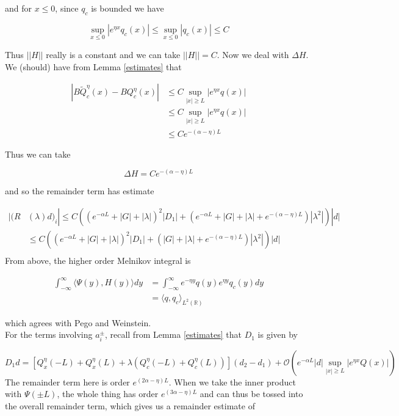 \documentclass[12pt]{article}
\def\R{{\mathbb R}}
\begin{document}
and for $x \leq 0$, since $q_c$ is bounded we have

\[
\sup_{x \leq 0} |e^{\eta x} q_c(x)| \leq \sup_{x \leq 0} |q_c(x)| \leq C
\]

Thus $||H||$ really is a constant and we can take $||H|| = C$. Now we deal with $\Delta H$. We (should) have from Lemma \ref{estimates} that

\begin{align*}
| B \tilde{Q}^\eta_c(x) - B Q^\eta_c(x) | &\leq C \sup_{|x| \geq L} |e^{\eta x} q(x)| \\
&\leq C \sup_{|x| \geq L} |e^{\eta x} q(x)| \\
&\leq C e^{-(\alpha - \eta)L}
\end{align*}

Thus we can take 

\[
\Delta H = C e^{-(\alpha - \eta)L}
\]

and so the remainder term has estimate

\begin{align*}
|(R&(\lambda)d)_i| \leq C \left( (e^{-\alpha L} + |G| + |\lambda|)^2 |D_1| + (e^{-\alpha L} + |G| + |\lambda| + e^{-(\alpha - \eta)L})|\lambda^2| \right)|d| \\
&\leq C \left( (e^{-\alpha L} + |G| + |\lambda|)^2 |D_1| + (|G| + |\lambda| + e^{-(\alpha - \eta)L})|\lambda^2| \right)|d| \\
\end{align*}
From above, the higher order Melnikov integral is

\begin{align*}
\int_{-\infty}^{\infty} \langle \Psi(y), H(y) \rangle dy &= \int_{-\infty}^{\infty} e^{-\eta y} q(y) e^{\eta y} q_c(y) dy \\
&= \langle q, q_c \rangle_{L^2(\R)}
\end{align*}

which agrees with Pego and Weinstein. \\

For the terms involving $a_i^\pm$, recall from Lemma \ref{estimates} that $D_1$ is given by

\[
D_1 d = [Q^\eta_x(-L) + Q^\eta_x(L) + 
\lambda(Q^\eta_c(-L) + Q^\eta_c(L))](d_2 - d_1) + \mathcal{O}\left(e^{-\alpha L} |d| \sup_{|x| \geq L} |e^{\eta x} Q(x)| \right)
\]
The remainder term here is order $e^{(2 \alpha - \eta)L}$. When we take the inner product with $\Psi(\pm L)$, the whole thing has order $e^{(3 \alpha - \eta)L}$ and can thus be tossed into the overall remainder term, which gives us a remainder estimate of 
\end{document}
